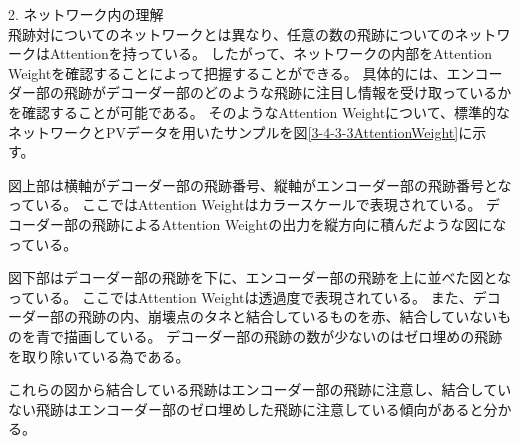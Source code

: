 2. ネットワーク内の理解\\

飛跡対についてのネットワークとは異なり、任意の数の飛跡についてのネットワークはAttentionを持っている。
したがって、ネットワークの内部をAttention Weightを確認することによって把握することができる。
具体的には、エンコーダー部の飛跡がデコーダー部のどのような飛跡に注目し情報を受け取っているかを確認することが可能である。
そのようなAttention Weightについて、標準的なネットワークとPVデータを用いたサンプルを図\ref{3-4-3-3AttentionWeight}に示す。

図上部は横軸がデコーダー部の飛跡番号、縦軸がエンコーダー部の飛跡番号となっている。
ここではAttention Weightはカラースケールで表現されている。
デコーダー部の飛跡によるAttention Weightの出力を縦方向に積んだような図になっている。

図下部はデコーダー部の飛跡を下に、エンコーダー部の飛跡を上に並べた図となっている。
ここではAttention Weightは透過度で表現されている。
また、デコーダー部の飛跡の内、崩壊点のタネと結合しているものを赤、結合していないものを青で描画している。
デコーダー部の飛跡の数が少ないのはゼロ埋めの飛跡を取り除いている為である。

これらの図から結合している飛跡はエンコーダー部の飛跡に注意し、結合していない飛跡はエンコーダー部のゼロ埋めした飛跡に注意している傾向があると分かる。


